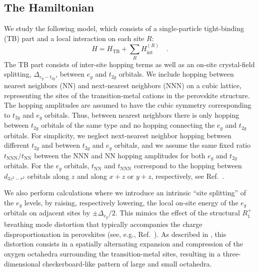 \documentclass[aps,prb,twocolumn,superscriptaddress,10pt]{revtex4-1}
\newcommand{\pref}[1]{\prettyref{#1}}%
\newcommand{\eg}{\ensuremath{{e_g}}\xspace}
\newcommand{\ttg}{\ensuremath{{t_{2g}}}\xspace}
\begin{document}
\subsection{The Hamiltonian}
\label{sec:ham}

We study the following model, which consists of a single-particle tight-binding (TB) part and a local interaction on each site $R$:
\begin{equation}
\label{eq:ham}
    H  = H_\text{TB} + \sum_R H_\text{int}^{(R)} \quad .
\end{equation}
The TB part consists of inter-site hopping terms as well as an on-site crystal-field splitting, $\Delta_{\eg - \ttg}$, between \eg and \ttg orbitals. We include hopping between nearest neighbors (NN) and next-nearest neighbors (NNN) on a cubic lattice, representing the sites of the transition-metal cations in the perovskite structure. The hopping amplitudes are assumed to have the cubic symmetry corresponding to \ttg and \eg orbitals. 
Thus, between nearest neighbors there is only hopping between \ttg orbitals of the same type and no hopping connecting the \eg and \ttg orbitals. 
%
For simplicity, we neglect next-nearest neighbor hopping between different $t_{2g}$ and between $t_{2g}$ and $e_g$ orbitals, and we assume the same fixed ratio $t_\mathrm{NNN}/t_\mathrm{NN}$ between the NNN and NN hopping amplitudes for both \eg and \ttg orbitals. 
For the $e_g$ orbitals, $t_\text{NN}$ and $t_\text{NNN}$ correspond to the hopping between $d_{3z^2-r^2}$ orbitals along $z$ and along $x+z$ or $y+z$, respectively, see Ref.~.

We also perform calculations where we introduce an intrinsic ``site splitting'' of the $e_g$ levels, by raising, respectively lowering, the local on-site energy of the \eg orbitals on adjacent sites by $\pm\Delta_\eg/2$.
This mimics the effect of the structural $R_1^+$ breathing mode distortion that typically accompanies the charge disproportionation in perovskites (see, e.g., Ref.~). As described in \pref{sec:introduction}, this distortion consists in a spatially alternating expansion and compression of the oxygen octahedra surrounding the transition-metal sites, resulting in a three-dimensional checkerboard-like pattern of large and small octahedra. 
\end{document}

